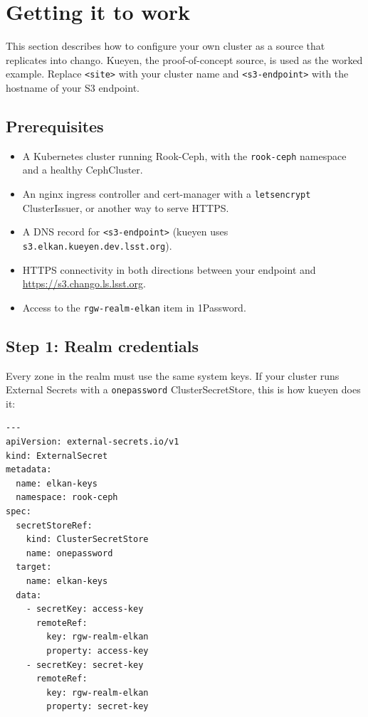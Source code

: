 \section{Getting it to work}

\label{sec:newsource}

This section describes how to configure your own cluster as a source that replicates into chango. Kueyen, the proof-of-concept source, is used as the worked example. Replace \texttt{<site>} with your cluster name and \texttt{<s3-endpoint>} with the hostname of your S3 endpoint.

\subsection{Prerequisites}

\begin{itemize}
  \item A Kubernetes cluster running Rook-Ceph, with the \texttt{rook-ceph} namespace and a healthy CephCluster.
  \item An nginx ingress controller and cert-manager with a \texttt{letsencrypt} ClusterIssuer, or another way to serve HTTPS.
  \item A DNS record for \texttt{<s3-endpoint>} (kueyen uses \texttt{s3.elkan.kueyen.dev.lsst.org}).
  \item HTTPS connectivity in both directions between your endpoint and \url{https://s3.chango.ls.lsst.org}.
  \item Access to the \texttt{rgw-realm-elkan} item in 1Password.
\end{itemize}

\subsection{Step 1: Realm credentials}

Every zone in the realm must use the same system keys. If your cluster runs External Secrets with a \texttt{onepassword} ClusterSecretStore, this is how kueyen does it:

{\small
\begin{verbatim}
---
apiVersion: external-secrets.io/v1
kind: ExternalSecret
metadata:
  name: elkan-keys
  namespace: rook-ceph
spec:
  secretStoreRef:
    kind: ClusterSecretStore
    name: onepassword
  target:
    name: elkan-keys
  data:
    - secretKey: access-key
      remoteRef:
        key: rgw-realm-elkan
        property: access-key
    - secretKey: secret-key
      remoteRef:
        key: rgw-realm-elkan
        property: secret-key
\end{verbatim}
}

